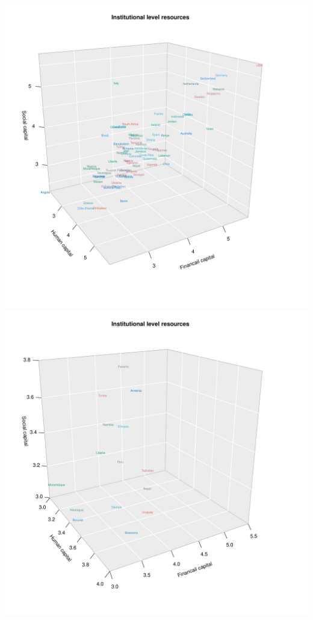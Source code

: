 \documentclass[
  english,
  man]{apa6}
\begin{document}
\includegraphics{Manuscript_files/figure-latex/unnamed-chunk-5-1.pdf} \includegraphics{Manuscript_files/figure-latex/unnamed-chunk-5-2.pdf}
\end{document}
